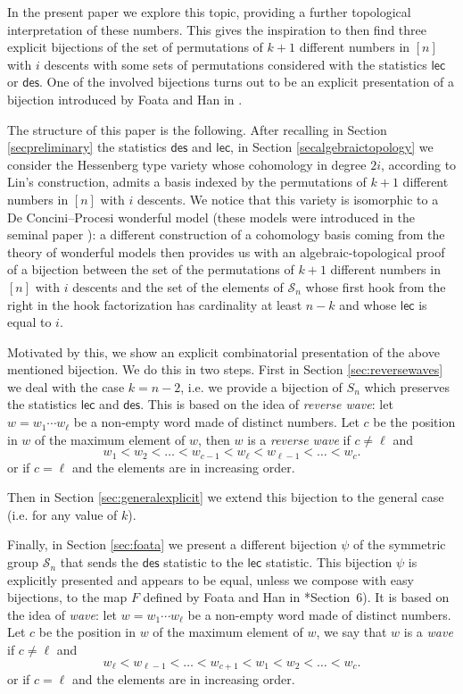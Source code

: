 \documentclass[a4paper]{amsart}
\newcommand{\des}{\mathsf{des}}
\newcommand{\lec}{\mathsf{lec}}
\theoremstyle{definition}
\theoremstyle{remark}
\numberwithin{equation}{section}
\begin{document}
In the present paper we explore this topic, providing a further topological  interpretation of these numbers.  This gives the inspiration to then find   three explicit bijections  of the set of permutations of $k+1$ different numbers in $[n]$ with $i$ descents with some sets of permutations considered with the statistics \(\lec\) or \(\des\). One of the involved bijections turns out to be  an explicit presentation of a bijection introduced by Foata and Han in \cite{FH08}.

The structure of this paper is the following. After recalling  in Section \ref{secpreliminary} the statistics \( \des\) and \(\lec\),  in Section \ref{secalgebraictopology} we consider the Hessenberg type variety whose cohomology in degree \(2i\), according to Lin's construction,  admits a basis indexed by the    permutations of $k+1$ different numbers in $[n]$ with $i$ descents.
We notice that this variety is isomorphic to a De Concini--Procesi wonderful model (these models were introduced in the seminal paper \cite{wonderful1}): a different construction of a cohomology basis coming from the theory of wonderful models then provides us with an algebraic-topological proof of a bijection between the set of the permutations of $k+1$ different numbers in $[n]$ with $i$ descents and the set of the elements of \(\mathcal{S}_n\) whose first hook from the right in the hook factorization has cardinality at least \(n-k\) and whose \(\lec\) is equal to \(i\).

Motivated by this,  we show an explicit combinatorial presentation of the above mentioned bijection. We do this in two steps. First in   Section \ref{sec:reversewaves} we deal with the case \(k=n-2\), i.e. we provide a bijection of \(S_n\) which preserves the statistics \(\lec\) and \(\des\). This is based on the idea of {\em reverse wave}:  let $w=w_1\cdots w_{\ell}$ be a non-empty word made of distinct numbers. Let $c$ be the position in $w$ of the maximum element of $w$, then  $w$ is a \textit{reverse wave} if $c\neq\ell$ and 
    \begin{equation}
    w_1<w_2<\dots<w_{c-1}<w_{\ell}<w_{\ell-1}<\dots<w_c.
    \end{equation}
    or if $c=\ell$ and the elements are in increasing order. 
    
    Then in Section \ref{sec:generalexplicit} we extend this bijection to the general case (i.e. for  any  value of \(k\)).
    
    
Finally, in Section \ref{sec:foata} we present a different  bijection $\psi$ of the symmetric group $\mathcal{S}_n$ that sends the $\des$ statistic to the $\lec$ statistic.  This bijection $\psi$ is explicitly presented and appears to be equal, unless we compose with easy bijections, to the map $F$ defined by Foata and Han in \cite{FH08}*{Section~6}). It is based on the idea of {\em wave}:  let $w=w_1\cdots w_{\ell}$ be a non-empty word made of distinct numbers. Let $c$ be the position in $w$ of the maximum element of $w$, we say that $w$ is a \textit{wave} if $c\neq\ell$ and 
    \begin{equation}
        w_{\ell}<w_{\ell-1}<\dots<w_{c+1}<w_1<w_2<\dots<w_c.
    \end{equation}
    or if $c=\ell$ and the elements are in increasing order. 
    
\end{document}
